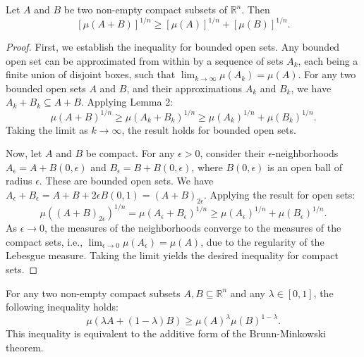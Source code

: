 \begin{theorem}
Let $A$ and $B$ be two non-empty compact subsets of $\mathbb{R}^n$. Then
$$[\mu(A+B)]^{1/n} \ge [\mu(A)]^{1/n} + [\mu(B)]^{1/n}.$$
\end{theorem}

\begin{proof}
First, we establish the inequality for bounded open sets. Any bounded open set can be approximated from within by a sequence of sets $A_k$, each being a finite union of disjoint boxes, such that $\lim_{k \to \infty} \mu(A_k) = \mu(A)$. For any two bounded open sets $A$ and $B$, and their approximations $A_k$ and $B_k$, we have $A_k+B_k \subseteq A+B$. Applying Lemma 2:
$$\mu(A+B)^{1/n} \ge \mu(A_k+B_k)^{1/n} \ge \mu(A_k)^{1/n} + \mu(B_k)^{1/n}.$$
Taking the limit as $k \to \infty$, the result holds for bounded open sets.

Now, let $A$ and $B$ be compact. For any $\epsilon > 0$, consider their $\epsilon$-neighborhoods $A_\epsilon = A + B(0,\epsilon)$ and $B_\epsilon = B + B(0,\epsilon)$, where $B(0,\epsilon)$ is an open ball of radius $\epsilon$. These are bounded open sets. We have $A_\epsilon+B_\epsilon = A+B+2\epsilon B(0,1) = (A+B)_{2\epsilon}$. Applying the result for open sets:
$$\mu((A+B)_{2\epsilon})^{1/n} = \mu(A_\epsilon+B_\epsilon)^{1/n} \ge \mu(A_\epsilon)^{1/n} + \mu(B_\epsilon)^{1/n}.$$
As $\epsilon \to 0$, the measures of the neighborhoods converge to the measures of the compact sets, i.e., $\lim_{\epsilon \to 0} \mu(A_\epsilon) = \mu(A)$, due to the regularity of the Lebesgue measure. Taking the limit yields the desired inequality for compact sets.
\end{proof}

\begin{theorem}
For any two non-empty compact subsets $A, B \subseteq \mathbb{R}^n$ and any $\lambda \in [0,1]$, the following inequality holds:
$$\mu(\lambda A + (1-\lambda)B) \ge \mu(A)^\lambda \mu(B)^{1-\lambda}.$$
This inequality is equivalent to the additive form of the Brunn-Minkowski theorem.
\end{theorem}

